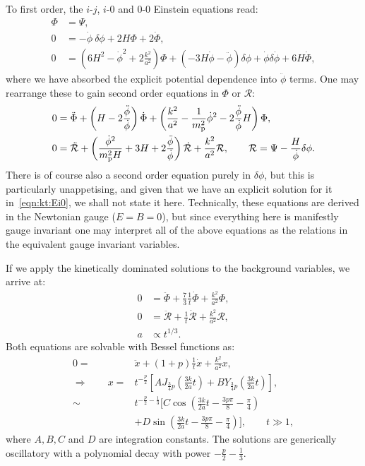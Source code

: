To first order, the \(i\)-\(j\), \(i\)-\(0\) and \(0\)-\(0\) Einstein equations read:
\begin{align}
  \Phi &= \Psi,
  \label{eqn:kt:Eij} \\
  0 &= -\dot{\phi}\:\delta\phi  + 2 H \Phi + 2 \dot{\Phi},
  \label{eqn:kt:Ei0}\\
  0 &= \left(6H^2-\dot{\phi}^2 + 2\frac{k^2}{a^2}\right)\Phi  + \left( -3H\dot{\phi} - \ddot{\phi} \right)\delta\phi + \dot{\phi}\delta\dot{\phi} +  6 H \dot{\Phi},
  \label{eqn:kt:E00}
\end{align}
where we have absorbed the explicit potential dependence into \(\ddot{\phi}\) terms. 
One may rearrange these to gain second order equations in \(\Phi\) or \(\mathcal{R}\):
\begin{align}
  0 &= \ddot{\Phi} + \left( H - 2 \frac{\ddot{\phi}}{\dot{\phi}} \right) \dot{\Phi} + \left( \frac{k^2}{a^2}-\frac{1}{m_{\mathrm{p}}^2}\dot{\phi}^2 - 2\frac{\ddot{\phi}}{\dot{\phi}}H \right)\Phi, \\
  0 &= \ddot{\mathcal{R}} + \left( \frac{\dot{\phi}^2}{m_{\mathrm{p}}^2H} + 3H + 2\frac{\ddot{\phi}}{\dot{\phi}} \right)\dot{\mathcal{R}} + \frac{k^2}{a^2}\mathcal{R}, \qquad \mathcal{R} = \Psi - \frac{H}{\dot{\phi}}\delta\phi.
\end{align}
There is of course also a second order equation purely in \(\delta\phi\), but this is particularly unappetising, and given that we have an explicit solution for it in~\eqref{eqn:kt:Ei0}, we shall not state it here.
Technically, these equations are derived in the Newtonian gauge (\(E=B=0\)), but since everything here is manifestly gauge invariant one may interpret all of the above equations as the relations in the equivalent gauge invariant variables.

If we apply the kinetically dominated solutions to the background variables, we arrive at:
\begin{align}
  0 &= \ddot{\Phi} + \frac{7}{3}\frac{1}{t}\dot{\Phi} + \frac{k^2}{a^2} \Phi,\\
  0 &= \ddot{\mathcal{R}} + \frac{1}{t}\dot{\mathcal{R}} + \frac{k^2}{a^2} \mathcal{R},\\
  a &\propto t^{1/3}.
\end{align}
Both equations are solvable with Bessel functions as:
\begin{align}
  0 =&\ddot{x} + (1+p)\frac{1}{t}\dot{x} + \frac{k^2}{a^2} x,  \\
  \Rightarrow \qquad
  x =& t^{-\frac{p}{2}}\left[ A J_{\frac{3}{4}p}\left( \frac{3k}{2a} t \right) + B Y_{\frac{3}{4}p}\left( \frac{3k}{2a} t \right) \right], \\
  \sim&  t^{-\frac{p}{2}-\frac{1}{3}}\Bigg[ C \cos\left( \frac{3k}{2a} t -\frac{3p\pi}{8} - \frac{\pi}{4} \right)  \nonumber\\
  &+ D \sin\left( \frac{3k}{2a} t -\frac{3p\pi}{8} - \frac{\pi}{4} \right) \Bigg], \qquad t \gg 1,
\end{align}
where \(A,B,C\) and \(D\) are integration constants. The solutions are generically oscillatory with a polynomial decay with power \(-\frac{p}{2} - \frac{1}{3}\).

